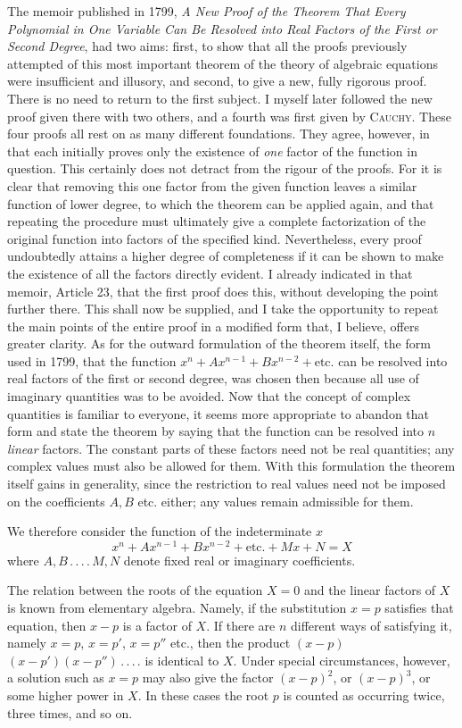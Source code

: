 The memoir published in 1799, \emph{A New Proof of the Theorem That Every Polynomial in One Variable Can Be Resolved into Real Factors of the First or Second Degree}, had two aims: first, to show that all the proofs previously attempted of this most important theorem of the theory of algebraic equations were insufficient and illusory, and second, to give a new, fully rigorous proof. There is no need to return to the first subject. I myself later followed the new proof given there with two others, and a fourth was first given by \textsc{Cauchy}. These four proofs all rest on as many different foundations. They agree, however, in that each initially proves only the existence of \emph{one} factor of the function in question. This certainly does not detract from the rigour of the proofs. For it is clear that removing this one factor from the given function leaves a similar function of lower degree, to which the theorem can be applied again, and that repeating the procedure must ultimately give a complete factorization of the original function into factors of the specified kind. Nevertheless, every proof undoubtedly attains a higher degree of completeness if it can be shown to make the existence of all the factors directly evident. I already indicated in that memoir, Article 23, that the first proof does this, without developing the point further there. This shall now be supplied, and I take the opportunity to repeat the main points of the entire proof in a modified form that, I believe, offers greater clarity. As for the outward formulation of the theorem itself, the form used in 1799, that the function $x^n+Ax^{n-1}+Bx^{n-2}+\mathrm{etc.}$ can be resolved into real factors of the first or second degree, was chosen then because all use of imaginary quantities was to be avoided. Now that the concept of complex quantities is familiar to everyone, it seems more appropriate to abandon that form and state the theorem by saying that the function can be resolved into $n$ \emph{linear} factors. The constant parts of these factors need not be real quantities; any complex values must also be allowed for them. With this formulation the theorem itself gains in generality, since the restriction to real values need not be imposed on the coefficients $A,B$ etc. either; any values remain admissible for them.

We therefore consider the function of the indeterminate $x$
\[
x^n+Ax^{n-1}+Bx^{n-2}+\mathrm{etc.}+Mx+N=X
\]
where $A,B\,.\,.\,.\,.\,M,N$ denote fixed real or imaginary coefficients.
\par
{}
The relation between the roots of the equation $X=0$ and the linear factors of $X$ is known from elementary algebra. Namely, if the substitution $x=p$ satisfies that equation, then $x-p$ is a factor of $X$. If there are $n$ different ways of satisfying it, namely $x=p$, $x=p'$, $x=p''$ etc., then the product $(x-p)$ $(x-p')(x-p'')\, .\, .\, .\, .$ is identical to $X$. Under special circumstances, however, a solution such as $x=p$ may also give the factor $(x-p)^2$, or $(x-p)^3$, or some higher power in $X$. In these cases the root $p$ is counted as occurring twice, three times, and so on.

